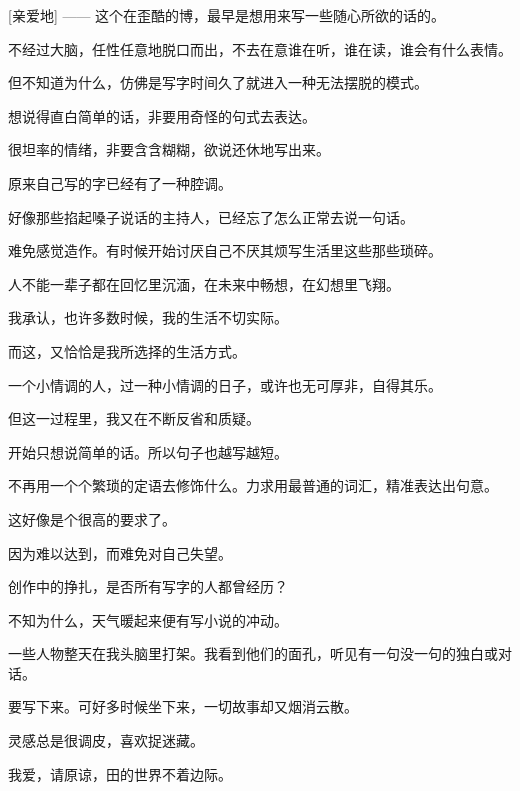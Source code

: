 \documentclass[12pt,a4paper]{article}
\begin{document}
	\endwriting



		[亲爱地] —— 这个在歪酷的博，最早是想用来写一些随心所欲的话的。\par
		不经过大脑，任性任意地脱口而出，不去在意谁在听，谁在读，谁会有什么表情。\par
		但不知道为什么，仿佛是写字时间久了就进入一种无法摆脱的模式。\par
		想说得直白简单的话，非要用奇怪的句式去表达。\par
		很坦率的情绪，非要含含糊糊，欲说还休地写出来。

		原来自己写的字已经有了一种腔调。\par
		好像那些掐起嗓子说话的主持人，已经忘了怎么正常去说一句话。\par
		难免感觉造作。有时候开始讨厌自己不厌其烦写生活里这些那些琐碎。

		人不能一辈子都在回忆里沉湎，在未来中畅想，在幻想里飞翔。\par
		我承认，也许多数时候，我的生活不切实际。\par
		而这，又恰恰是我所选择的生活方式。\par
		一个小情调的人，过一种小情调的日子，或许也无可厚非，自得其乐。\par
		但这一过程里，我又在不断反省和质疑。

		开始只想说简单的话。所以句子也越写越短。\par
		不再用一个个繁琐的定语去修饰什么。力求用最普通的词汇，精准表达出句意。\par
		这好像是个很高的要求了。\par
		因为难以达到，而难免对自己失望。\par
		创作中的挣扎，是否所有写字的人都曾经历？

		不知为什么，天气暖起来便有写小说的冲动。\par
		一些人物整天在我头脑里打架。我看到他们的面孔，听见有一句没一句的独白或对话。\par
		要写下来。可好多时候坐下来，一切故事却又烟消云散。

		灵感总是很调皮，喜欢捉迷藏。

	\endwriting



		我爱，请原谅，田的世界不着边际。
\end{document}

